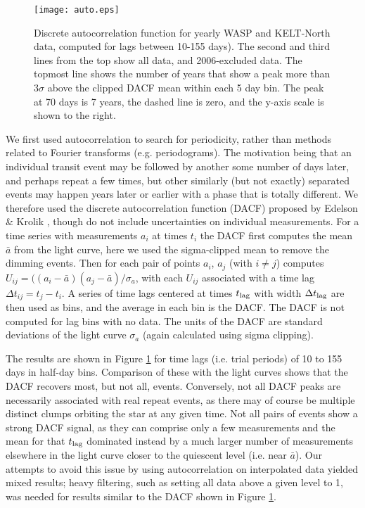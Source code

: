 \documentclass[]{rsos}
\begin{document}
\begin{figure}
\begin{center}
\hspace{-0.5cm} \texttt{[image: auto.eps]}
\caption{Discrete autocorrelation function for yearly WASP and KELT-North data, computed
  for lags between 10-155 days). The second and third lines from the top show all data,
  and 2006-excluded data. The topmost line shows the number of years that show a peak
  more than 3$\sigma$ above the clipped DACF mean within each 5 day bin. The peak at 70
  days is 7 years, the dashed line is zero, and the y-axis scale is shown to the
  right.}\label{fig:auto}
\end{center}
\end{figure}

We first used autocorrelation to search for periodicity, rather than methods related to
Fourier transforms (e.g. periodograms). The motivation being that an individual transit
event may be followed by another some number of days later, and perhaps repeat a few
times, but other similarly (but not exactly) separated events may happen years later or
earlier with a phase that is totally different. We therefore used the discrete
autocorrelation function (DACF) proposed by Edelson \& Krolik \cite{1988ApJ...333..646E},
though do not include uncertainties on individual measurements. For a time series with
measurements $a_i$ at times $t_i$ the DACF first computes the mean $\bar{a}$ from the
light curve, here we used the sigma-clipped mean to remove the dimming events. Then for
each pair of points $a_i$, $a_j$ (with $i\ne j$) computes
$U_{ij}=((a_i-\bar{a})(a_j-\bar{a}) / \sigma_a$, with each $U_{ij}$ associated with a
time lag $\Delta t_{ij}=t_j - t_i$. A series of time lags centered at times $t_{\rm lag}$
with width $\Delta t_{\rm lag}$ are then used as bins, and the average in each bin is the
DACF. The DACF is not computed for lag bins with no data. The units of the DACF are
standard deviations of the light curve $\sigma_a$ (again calculated using sigma
clipping).

The results are shown in Figure \ref{fig:auto} for time lags (i.e. trial periods) of 10
to 155 days in half-day bins. Comparison of these with the light curves shows that the
DACF recovers most, but not all, events. Conversely, not all DACF peaks are necessarily
associated with real repeat events, as there may of course be multiple distinct clumps
orbiting the star at any given time. Not all pairs of events show a strong DACF signal,
as they can comprise only a few measurements and the mean for that $t_{\rm lag}$
dominated instead by a much larger number of measurements elsewhere in the light curve
closer to the quiescent level (i.e. near $\bar{a}$). Our attempts to avoid this issue by
using autocorrelation on interpolated data yielded mixed results; heavy filtering, such
as setting all data above a given level to 1, was needed for results similar to the DACF
shown in Figure \ref{fig:auto}.
\end{document}
